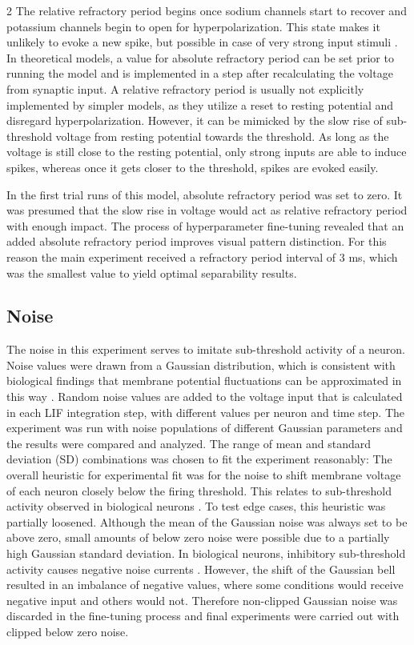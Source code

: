 \documentclass[12pt,a4paper]{article}
\begin{document}
\begin{multicols}{2}
            The relative refractory period begins once sodium channels start to recover and potassium channels begin to open for hyperpolarization. This state makes it unlikely to evoke a new spike, but possible in case of very strong input stimuli \cite{S}. In theoretical models, a value for absolute refractory period can be set prior to running the model and is implemented in a step after recalculating the voltage from synaptic input. A relative refractory period is usually not explicitly implemented by simpler models, as they utilize a reset to resting potential and disregard hyperpolarization. However, it can be mimicked by the slow rise of sub-threshold voltage from resting potential towards the threshold. As long as the voltage is still close to the resting potential, only strong inputs are able to induce spikes, whereas once it gets closer to the threshold, spikes are evoked easily.
            
            In the first trial runs of this model, absolute refractory period was set to zero. It was presumed that the slow rise in voltage would act as relative refractory period with enough impact. The process of hyperparameter fine-tuning revealed that an added absolute refractory period improves visual pattern distinction. For this reason the main experiment received a refractory period interval of 3 ms, which was the smallest value to yield optimal separability results.
            
        \subsection{Noise}\label{sec:clipgauss}
            The noise in this experiment serves to imitate sub-threshold activity of a neuron. Noise values were drawn from a Gaussian distribution, which is consistent with biological findings that membrane potential fluctuations can be approximated in this way \cite{O}. Random noise values are added to the voltage input that is calculated in each LIF integration step, with different values per neuron and time step. The experiment was run with noise populations of different Gaussian parameters and the results were compared and analyzed. The range of mean and standard deviation (SD) combinations was chosen to fit the experiment reasonably: The overall heuristic for experimental fit was for the noise to shift membrane voltage of each neuron closely below the firing threshold. This relates to sub-threshold activity observed in biological neurons \cite{F}. To test edge cases, this heuristic was partially loosened. Although the mean of the Gaussian noise was always set to be above zero, small amounts of below zero noise were possible due to a partially high Gaussian standard deviation. In biological neurons, inhibitory sub-threshold activity  causes negative noise currents \cite{F}. However, the shift of the Gaussian bell resulted in an imbalance of negative values, where some conditions would receive negative input and others would not. Therefore non-clipped Gaussian noise was discarded in the fine-tuning process and final experiments were carried out with clipped below zero noise.
            

\end{multicols}
\end{document}
